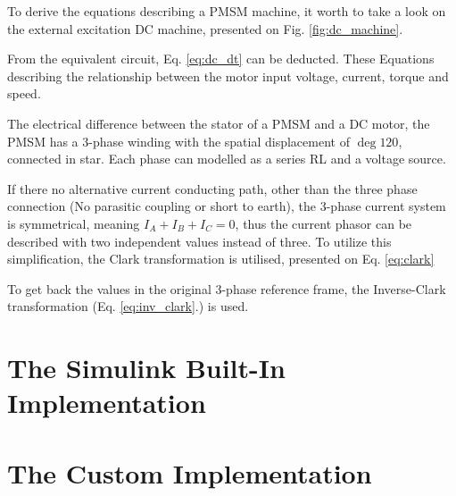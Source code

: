 \documentclass[twoside,b5paper,10pt]{article}
\begin{document}
To derive the equations describing a PMSM machine, it worth to take a look on the external excitation DC machine, presented on Fig. \ref{fig:dc_machine}.



From the equivalent circuit, Eq. \ref{eq:dc_dt} can be deducted. These Equations describing the relationship between the motor input voltage, current, torque and speed.



The electrical difference between the stator of a PMSM and a DC motor, the PMSM has a 3-phase winding with the spatial displacement of $\deg{120}$, connected in star. Each phase can modelled as a series RL and a voltage source. 



If there no alternative current conducting path, other than the three phase connection (No parasitic coupling or short to earth), the 3-phase current system is symmetrical, meaning $I_A + I_B + I_C = 0$, thus the current phasor can be described with two independent values instead of three. To utilize this simplification, the Clark transformation is utilised, presented on Eq. \ref{eq:clark}



To get back the values in the original 3-phase reference frame, the Inverse-Clark transformation (Eq. \ref{eq:inv_clark}.) is used.
















\section{The Simulink Built-In Implementation}
\label{sec:simulink_model}

\section{The Custom Implementation}
\label{sec:custom_model}
\end{document}
